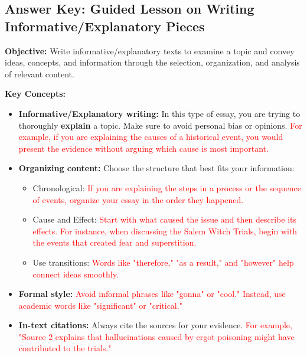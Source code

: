 \documentclass[12pt]{article}
\begin{document}
\subsection*{Answer Key: Guided Lesson on Writing Informative/Explanatory Pieces}
\onehalfspacing

\begin{tcolorbox}[colframe=black!40, colback=gray!5, 
coltitle=black, colbacktitle=black!20, fonttitle=\bfseries\Large, 
title=Learning Objective, halign title=center, left=5pt, right=5pt, top=5pt, bottom=15pt]
\textbf{Objective:} Write informative/explanatory texts to examine a topic and convey ideas, concepts, and information through the selection, organization, and analysis of relevant content.
\end{tcolorbox}

\vspace{1em}

\begin{tcolorbox}[colframe=black!60, colback=white, 
coltitle=black, colbacktitle=black!15, fonttitle=\bfseries\Large, 
title=Key Concepts and Vocabulary, halign title=center, left=10pt, right=10pt, top=10pt, bottom=15pt]
\textbf{Key Concepts:}
\begin{itemize}
    \item \textbf{Informative/Explanatory writing:} In this type of essay, you are trying to thoroughly \textbf{explain} a topic. Make sure to avoid personal bias or opinions. \textcolor{red}{For example, if you are explaining the causes of a historical event, you would present the evidence without arguing which cause is most important.}
    \item \textbf{Organizing content:} Choose the structure that best fits your information:
    \begin{itemize}
        \item Chronological: \textcolor{red}{If you are explaining the steps in a process or the sequence of events, organize your essay in the order they happened.}
        \item Cause and Effect: \textcolor{red}{Start with what caused the issue and then describe its effects. For instance, when discussing the Salem Witch Trials, begin with the events that created fear and superstition.}
        \item Use transitions: \textcolor{red}{Words like "therefore," "as a result," and "however" help connect ideas smoothly.}
    \end{itemize}
    \item \textbf{Formal style:} \textcolor{red}{Avoid informal phrases like "gonna" or "cool." Instead, use academic words like "significant" or "critical."}
    \item \textbf{In-text citations:} Always cite the sources for your evidence. \textcolor{red}{For example, "Source 2 explains that hallucinations caused by ergot poisoning might have contributed to the trials."}
\end{itemize}
\end{tcolorbox}
\end{document}
